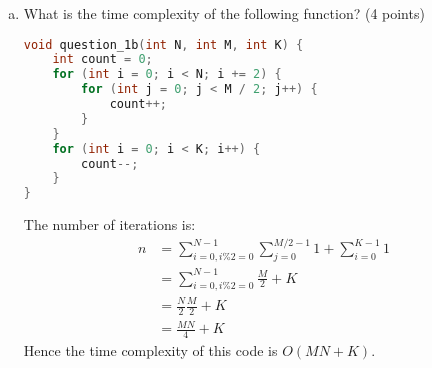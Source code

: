 \documentclass[11pt]{exam}
\begin{document}
\begin{enumerate}[(a)]
\begin{solution}
\end{solution}

\item What is the time complexity of the following function? (4 points)
\begin{lstlisting}[language=c++]
void question_1b(int N, int M, int K) {
	int count = 0;
	for (int i = 0; i < N; i += 2) {
		for (int j = 0; j < M / 2; j++) {
			count++;
		}
	}
	for (int i = 0; i < K; i++) {
		count--;
	}
}
\end{lstlisting}

\begin{solution}
The number of iterations is:
\begin{equation*}
    \begin{aligned}
    n &=\sum_{i=0, i \% 2=0}^{N-1} \sum_{j=0}^{M/2-1} 1 + \sum_{i=0}^{K-1} 1 \\
    &=\sum_{i=0, i \% 2=0}^{N-1} \frac{M}{2} + K \\
    &=\frac{N}{2} \frac{M}{2} + K \\
    &=\frac{MN}{4} + K
    \end{aligned}
\end{equation*}
Hence the time complexity of this code is $O(MN+K)$.
\end{solution}


\end{enumerate}
\end{document}
